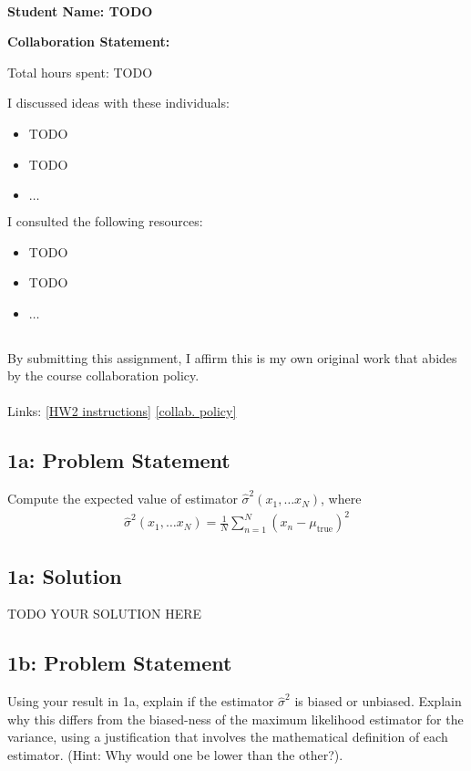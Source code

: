 \documentclass[10pt]{article}
\newcommand{\officialdirections}[1]{{\color{purple} #1}}
\begin{document}
~~\\ %

{\Large{\bf Student Name: TODO}}

\Large{\bf Collaboration Statement:}

Total hours spent: TODO

I discussed ideas with these individuals:
\begin{itemize}
\item TODO
\item TODO
\item $\ldots$	
\end{itemize}

I consulted the following resources:
\begin{itemize}
\item TODO
\item TODO
\item $\ldots$	
\end{itemize}
~~\\
By submitting this assignment, I affirm this is my own original work that abides by the course collaboration policy.
~~\\
~~\\
Links: 
\href{https://www.cs.tufts.edu/cs/136/2024s/hw2.html}{[HW2 instructions]} 
\href{https://www.cs.tufts.edu/cs/136/2024s/index.html#collaboration}{[collab. policy]} 

\tableofcontents

\newpage

\officialdirections{
\subsection*{1a: Problem Statement}
Compute the expected value of estimator $\hat{\sigma}^2(x_1, \ldots x_N)$, where
\begin{align}
\hat{\sigma}^2(x_1, \ldots x_N) = \frac{1}{N} \sum_{n=1}^N (x_n - \mu_{\text{true}})^2
\end{align}
}

\subsection{1a: Solution}
TODO YOUR SOLUTION HERE

\officialdirections{
\subsection*{1b: Problem Statement}
Using your result in 1a, explain if the estimator $\hat{\sigma}^2$ is biased or unbiased. Explain why this differs from the biased-ness of the maximum likelihood estimator for the variance, using a justification that involves the mathematical definition of each estimator. (Hint: Why would one be lower than the other?).
}
\end{document}
